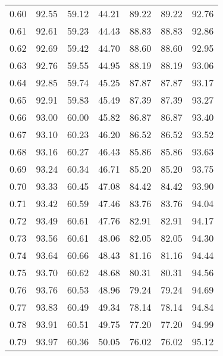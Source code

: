 \begin{tabular}{|c|c|c|c|c|c|c|}
      0.60 &     92.55 &     59.12 &      44.21 &   89.22 &      89.22 &         92.76 \\
      0.61 &     92.61 &     59.23 &      44.43 &   88.83 &      88.83 &         92.86 \\
      0.62 &     92.69 &     59.42 &      44.70 &   88.60 &      88.60 &         92.95 \\
      0.63 &     92.76 &     59.55 &      44.95 &   88.19 &      88.19 &         93.06 \\
      0.64 &     92.85 &     59.74 &      45.25 &   87.87 &      87.87 &         93.17 \\
      0.65 &     92.91 &     59.83 &      45.49 &   87.39 &      87.39 &         93.27 \\
      0.66 &     93.00 &     60.00 &      45.82 &   86.87 &      86.87 &         93.40 \\
      0.67 &     93.10 &     60.23 &      46.20 &   86.52 &      86.52 &         93.52 \\
      0.68 &     93.16 &     60.27 &      46.43 &   85.86 &      85.86 &         93.63 \\
      0.69 &     93.24 &     60.34 &      46.71 &   85.20 &      85.20 &         93.75 \\
      0.70 &     93.33 &     60.45 &      47.08 &   84.42 &      84.42 &         93.90 \\
      0.71 &     93.42 &     60.59 &      47.46 &   83.76 &      83.76 &         94.04 \\
      0.72 &     93.49 &     60.61 &      47.76 &   82.91 &      82.91 &         94.17 \\
      0.73 &     93.56 &     60.61 &      48.06 &   82.05 &      82.05 &         94.30 \\
      0.74 &     93.64 &     60.66 &      48.43 &   81.16 &      81.16 &         94.44 \\
      0.75 &     93.70 &     60.62 &      48.68 &   80.31 &      80.31 &         94.56 \\
      0.76 &     93.76 &     60.53 &      48.96 &   79.24 &      79.24 &         94.69 \\
      0.77 &     93.83 &     60.49 &      49.34 &   78.14 &      78.14 &         94.84 \\
      0.78 &     93.91 &     60.51 &      49.75 &   77.20 &      77.20 &         94.99 \\
      0.79 &     93.97 &     60.36 &      50.05 &   76.02 &      76.02 &         95.12 \\

\end{tabular}
